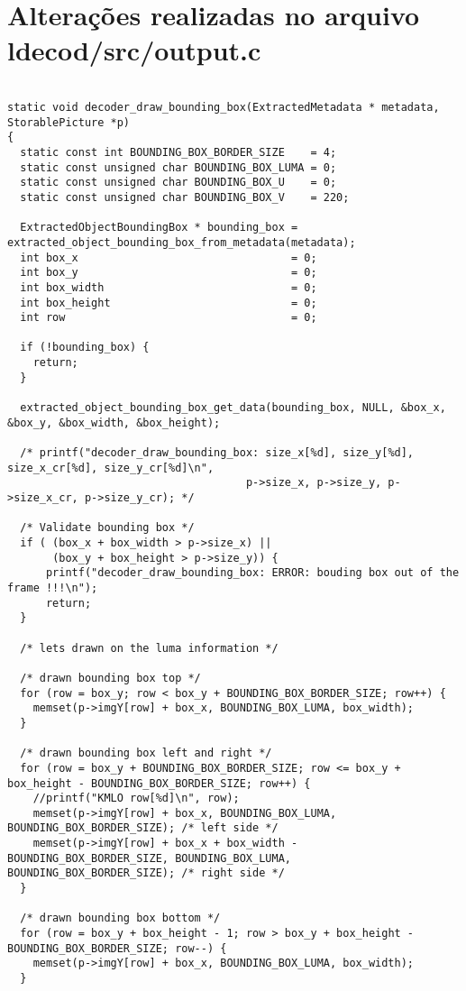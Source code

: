 \section{Alterações realizadas no arquivo ldecod/src/output.c}

\begin{lstlisting}

static void decoder_draw_bounding_box(ExtractedMetadata * metadata, StorablePicture *p)
{
  static const int BOUNDING_BOX_BORDER_SIZE    = 4;
  static const unsigned char BOUNDING_BOX_LUMA = 0;
  static const unsigned char BOUNDING_BOX_U    = 0;
  static const unsigned char BOUNDING_BOX_V    = 220;   

  ExtractedObjectBoundingBox * bounding_box = extracted_object_bounding_box_from_metadata(metadata);
  int box_x                                 = 0;
  int box_y                                 = 0;
  int box_width                             = 0;
  int box_height                            = 0;
  int row                                   = 0;
 
  if (!bounding_box) {
    return;
  }

  extracted_object_bounding_box_get_data(bounding_box, NULL, &box_x, &box_y, &box_width, &box_height);

  /* printf("decoder_draw_bounding_box: size_x[%d], size_y[%d], size_x_cr[%d], size_y_cr[%d]\n", 
                                     p->size_x, p->size_y, p->size_x_cr, p->size_y_cr); */

  /* Validate bounding box */
  if ( (box_x + box_width > p->size_x) ||
       (box_y + box_height > p->size_y)) {
      printf("decoder_draw_bounding_box: ERROR: bouding box out of the frame !!!\n");
      return;
  }

  /* lets drawn on the luma information */

  /* drawn bounding box top */
  for (row = box_y; row < box_y + BOUNDING_BOX_BORDER_SIZE; row++) {
    memset(p->imgY[row] + box_x, BOUNDING_BOX_LUMA, box_width);
  }

  /* drawn bounding box left and right */
  for (row = box_y + BOUNDING_BOX_BORDER_SIZE; row <= box_y + box_height - BOUNDING_BOX_BORDER_SIZE; row++) {
    //printf("KMLO row[%d]\n", row);
    memset(p->imgY[row] + box_x, BOUNDING_BOX_LUMA, BOUNDING_BOX_BORDER_SIZE); /* left side */
    memset(p->imgY[row] + box_x + box_width - BOUNDING_BOX_BORDER_SIZE, BOUNDING_BOX_LUMA, BOUNDING_BOX_BORDER_SIZE); /* right side */
  }

  /* drawn bounding box bottom */
  for (row = box_y + box_height - 1; row > box_y + box_height - BOUNDING_BOX_BORDER_SIZE; row--) {
    memset(p->imgY[row] + box_x, BOUNDING_BOX_LUMA, box_width);
  }


\end{lstlisting}
